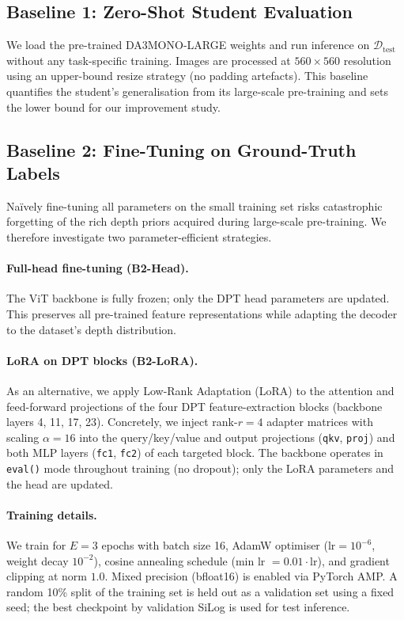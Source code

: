 \documentclass{article}
\begin{document}
\subsection{Baseline 1: Zero-Shot Student Evaluation}

We load the pre-trained DA3MONO-LARGE weights and run inference on $\mathcal{D}_{\text{test}}$ without any task-specific training.
Images are processed at $560 \times 560$ resolution using an upper-bound resize strategy (no padding artefacts).
This baseline quantifies the student's generalisation from its large-scale pre-training and sets the lower bound for our improvement study.

\subsection{Baseline 2: Fine-Tuning on Ground-Truth Labels}

Na\"ively fine-tuning all parameters on the small training set risks catastrophic forgetting of the rich depth priors acquired during large-scale pre-training.
We therefore investigate two parameter-efficient strategies.

\paragraph{Full-head fine-tuning (B2-Head).}
The ViT backbone is fully frozen; only the DPT head parameters are updated.
This preserves all pre-trained feature representations while adapting the decoder to the dataset's depth distribution.

\paragraph{LoRA on DPT blocks (B2-LoRA).}
As an alternative, we apply Low-Rank Adaptation (LoRA) \cite{TODO_lora} to the attention and feed-forward projections of the four DPT feature-extraction blocks (backbone layers 4, 11, 17, 23).
Concretely, we inject rank-$r = 4$ adapter matrices with scaling $\alpha = 16$ into the query/key/value and output projections (\texttt{qkv}, \texttt{proj}) and both MLP layers (\texttt{fc1}, \texttt{fc2}) of each targeted block.
The backbone operates in \texttt{eval()} mode throughout training (no dropout); only the LoRA parameters and the head are updated.

\paragraph{Training details.}
We train for $E = 3$ epochs with batch size 16, AdamW optimiser ($\text{lr} = 10^{-6}$, weight decay $10^{-2}$), cosine annealing schedule (min lr $= 0.01 \cdot \text{lr}$), and gradient clipping at norm $1.0$.
Mixed precision (bfloat16) is enabled via PyTorch AMP.
A random 10\% split of the training set is held out as a validation set using a fixed seed; the best checkpoint by validation SiLog is used for test inference.
\end{document}
